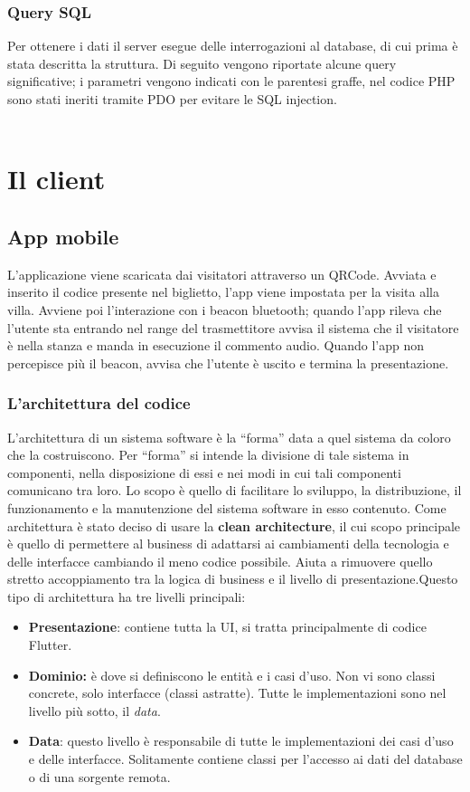 \documentclass[12pt]{article}
\begin{document}
\subsubsection{Query SQL}
Per ottenere i dati il server esegue delle interrogazioni al database, di cui prima è stata descritta la struttura. Di seguito vengono riportate alcune query significative; i parametri vengono indicati con le parentesi graffe, nel codice PHP sono stati ineriti tramite PDO per evitare le SQL injection.\\\\

\section{Il client}
\subsection{App mobile}
L'applicazione viene scaricata dai visitatori attraverso un QRCode. Avviata
e inserito il codice presente nel biglietto, l’app viene impostata per la visita alla villa. Avviene poi l'interazione con i beacon bluetooth; quando l’app rileva che l'utente sta entrando nel range del trasmettitore avvisa il sistema che il visitatore è nella stanza e manda in esecuzione il commento audio. Quando l’app non percepisce più il beacon, avvisa  che l’utente è uscito e termina la presentazione.

\subsubsection{L'architettura del codice}
L’architettura di un sistema software è la “forma” data a quel sistema da coloro che la costruiscono. Per  “forma” si intende la divisione di tale sistema in componenti, nella disposizione di essi e nei modi in cui tali componenti comunicano tra loro. Lo scopo è  quello di facilitare lo sviluppo, la distribuzione, il funzionamento e la manutenzione del sistema software in esso contenuto.\cite{architettura_codice}
Come architettura è stato deciso di usare la \textbf{clean architecture}, il cui scopo principale è quello di permettere al business di adattarsi ai cambiamenti della tecnologia e delle interfacce cambiando il meno codice possibile. Aiuta a rimuovere quello stretto accoppiamento tra la logica di business e il livello di presentazione.\cite{architettura_introduction}\clearpage Questo tipo di architettura ha tre livelli principali:
\begin{itemize}
    \item \textbf{Presentazione}: contiene tutta la UI, si tratta principalmente di codice Flutter. 
    \item \textbf{Dominio:} è dove si definiscono le entità e i casi d'uso. Non vi sono classi concrete, solo interfacce (classi astratte). Tutte le implementazioni sono nel livello più sotto, il \emph{data}. 
    \item \textbf{Data}: questo livello è responsabile di tutte le implementazioni dei casi d'uso e delle interfacce. Solitamente contiene classi per l'accesso ai dati del database o di una sorgente remota.
\end{itemize}
\end{document}
